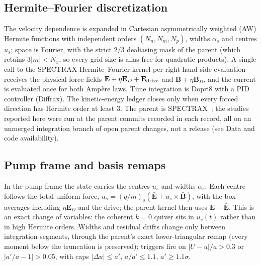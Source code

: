 \documentclass[aps,pre,reprint,floatfix,amsmath,amssymb,nofootinbib,superscriptaddress]{revtex4-2}
\begin{document}
\subsection{Hermite--Fourier discretization}
The velocity dependence is expanded in Cartesian asymmetrically weighted (AW) Hermite functions with independent orders $(N_n,N_m,N_p)$, widths $\alpha_s$ and centres $u_s$; space is Fourier, with the strict $2/3$ dealiasing mask of the parent (which retains $3|m|<N_x$, so every grid size is alias-free for quadratic products). A single call to the SPECTRAX Hermite--Fourier kernel per right-hand-side evaluation receives the physical force fields $\mathbf E+\eta\mathbf E_D+\mathbf E_{\rm drive}$ and $\mathbf B+\eta\mathbf B_D$, and the current is evaluated once for both Amp\`ere laws. Time integration is Dopri8 with a PID controller (Diffrax). The kinetic-energy ledger closes only when every forced direction has Hermite order at least 3. The parent is SPECTRAX~\cite{SPECTRAX}; the studies reported here were run at the parent commits recorded in each record, all on an unmerged integration branch of open parent changes, not a release (see Data and code availability).

\subsection{Pump frame and basis remaps}
In the pump frame the state carries the centres $u_s$ and widths $\alpha_s$. Each centre follows the total uniform force, $\dot u_s=(q/m)_s(\bar{\mathbf E}+u_s\times\bar{\mathbf B})$, with the box averages including $\eta\mathbf E_D$ and the drive; the parent kernel then uses $\mathbf E-\bar{\mathbf E}$. This is an exact change of variables: the coherent $k=0$ quiver sits in $u_s(t)$ rather than in high Hermite orders. Widths and residual drifts change only between integration segments, through the parent's exact lower-triangular remap (every moment below the truncation is preserved); triggers fire on $|U-u|/a>0.3$ or $|a'/a-1|>0.05$, with caps $|\Delta u|\le a'$, $a/a'\le1.1$, $a'\ge1.1\sigma$.
\end{document}
